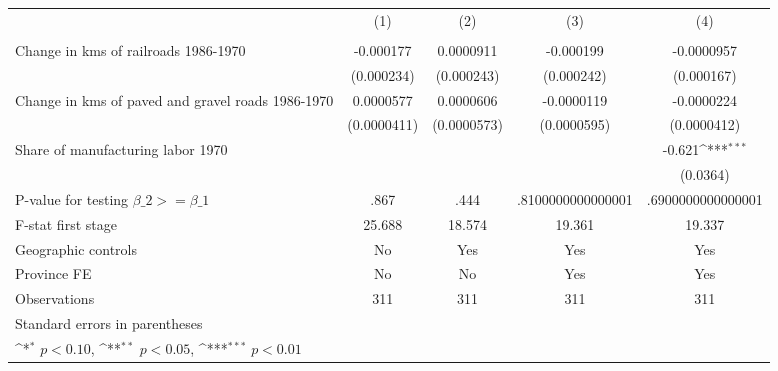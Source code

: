 {
\def\sym#1{\ifmmode^{#1}\else\(^{#1}\)\fi}
\begin{tabular}{l*{4}{c}}
\hline\hline
                &\multicolumn{1}{c}{(1)}&\multicolumn{1}{c}{(2)}&\multicolumn{1}{c}{(3)}&\multicolumn{1}{c}{(4)}\\
                &\multicolumn{1}{c}{}&\multicolumn{1}{c}{}&\multicolumn{1}{c}{}&\multicolumn{1}{c}{}\\
\hline
Change in kms of railroads 1986-1970&-0.000177         &0.0000911         &-0.000199         &-0.0000957         \\
                &(0.000234)         &(0.000243)         &(0.000242)         &(0.000167)         \\
[1em]
Change in kms of paved and gravel roads 1986-1970&0.0000577         &0.0000606         &-0.0000119         &-0.0000224         \\
                &(0.0000411)         &(0.0000573)         &(0.0000595)         &(0.0000412)         \\
[1em]
Share of manufacturing labor 1970&                  &                  &                  &   -0.621\sym{***}\\
                &                  &                  &                  & (0.0364)         \\
\hline
P-value for testing $\beta\_{2} >= \beta\_{1}$&     .867         &     .444         &.8100000000000001         &.6900000000000001         \\
F-stat first stage&   25.688         &   18.574         &   19.361         &   19.337         \\
Geographic controls&       No         &      Yes         &      Yes         &      Yes         \\
Province FE     &       No         &       No         &      Yes         &      Yes         \\
Observations    &      311         &      311         &      311         &      311         \\
\hline\hline
\multicolumn{5}{l}{\footnotesize Standard errors in parentheses}\\
\multicolumn{5}{l}{\footnotesize \sym{*} \(p<0.10\), \sym{**} \(p<0.05\), \sym{***} \(p<0.01\)}\\
\end{tabular}
}
